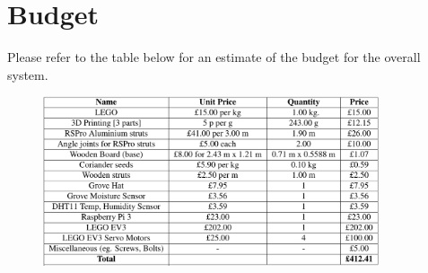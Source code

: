\documentclass{article}
\begin{document}
\section{Budget}\label{budget_account}
Please refer to the table below for an estimate of the budget for the overall system. 

\begin{figure}[b!]
    \centering
    \includegraphics[width=375, angle = -90,keepaspectratio]{figs/budgettableNEW.png} 
    
\end{figure}


\end{document}
